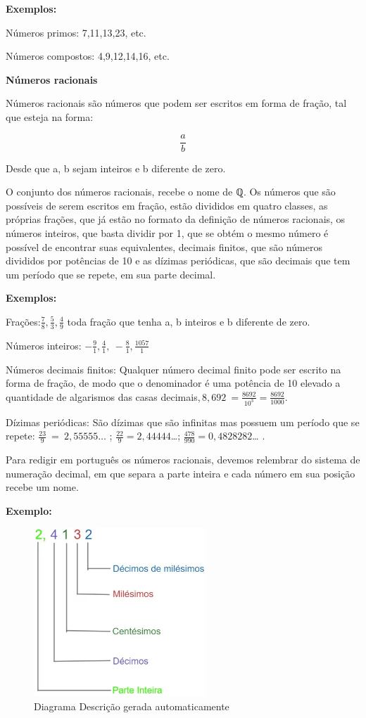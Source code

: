 \textbf{Exemplos:}

Números primos: 7,11,13,23, etc.

Números compostos: 4,9,12,14,16, etc.

\textbf{Números racionais}

Números racionais são números que podem ser escritos em forma de fração,
tal que esteja na forma:

\[\frac{a}{b}\]

Desde que a, b sejam inteiros e b diferente de zero.

O conjunto dos números racionais, recebe o nome de ℚ. Os números que são
possíveis de serem escritos em fração, estão divididos em quatro
classes, as próprias frações, que já estão no formato da definição de
números racionais, os números inteiros, que basta dividir por 1, que se
obtém o mesmo número é possível de encontrar suas equivalentes, decimais
finitos, que são números divididos por potências de 10 e as dízimas
periódicas, que são decimais que tem um período que se repete, em sua
parte decimal.

\textbf{Exemplos:}

Frações:\(\frac{7}{8},\frac{5}{3},\frac{4}{9}\) toda fração que tenha a,
b inteiros e b diferente de zero.

Números inteiros:
\(- \frac{9}{1},\frac{4}{1},\  - \frac{8}{1},\frac{1057}{1}\)

Números decimais finitos: Qualquer número decimal finito pode ser
escrito na forma de fração, de modo que o denominador é uma potência de
10 elevado a quantidade de algarismos das casas
decimais\(,8,692\  = \frac{8692}{10^{3}} = \frac{8692}{1000}\).

Dízimas periódicas: São dízimas que são infinitas mas possuem um período
que se repete: \(\frac{23}{9}\  = \ 2,55555\ldots\) ;
\(\frac{22}{9} = 2,44444\)\ldots;
\(\frac{478}{990} = 0,4828282\)\ldots{} .

Para redigir em português os números racionais, devemos relembrar do
sistema de numeração decimal, em que separa a parte inteira e cada
número em sua posição recebe um nome.~

\textbf{Exemplo:~}

\begin{figure}
\centering
\includegraphics[width=2.54167in,height=2.5in]{./imgSAEB_7_MAT/media/image1.png}
\caption{Diagrama Descrição gerada automaticamente}
\end{figure}

